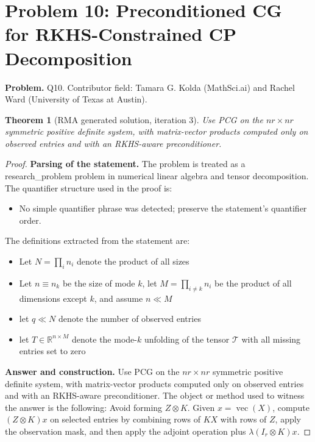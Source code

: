 \documentclass[11pt]{article}
\newtheorem{theorem}{Theorem}
\begin{document}
\section*{Problem 10: Preconditioned CG for RKHS-Constrained CP Decomposition}

\noindent\textbf{Problem.} Q10. Contributor field: Tamara G. Kolda (MathSci.ai) and Rachel Ward (University of Texas at Austin).

\begin{theorem}[RMA generated solution, iteration 3]
Use PCG on the \(nr\times nr\) symmetric positive definite system, with matrix-vector products computed only on observed entries and with an RKHS-aware preconditioner.
\end{theorem}

\begin{proof}
\textbf{Parsing of the statement.}
The problem is treated as a research_problem problem in numerical linear algebra and tensor decomposition.
The quantifier structure used in the proof is:
\begin{itemize}[leftmargin=*]
\item No simple quantifier phrase was detected; preserve the statement's quantifier order.
\end{itemize}
The definitions extracted from the statement are:
\begin{itemize}[leftmargin=*]
\item Let $N = \prod_i n_i$ denote the product of all sizes
\item Let $n \equiv n_k$ be the size of mode $k$, let $M = \prod_{i\neq k} n_i$ be the product of all dimensions except $k$, and assume $n \ll M$
\item let $q \ll N$ denote the number of observed entries
\item let $T \in \mathbb{R}^{n \times M}$ denote the mode-$k$ unfolding of the tensor $\mathcal{T}$ with all missing entries set to zero
\end{itemize}

\textbf{Answer and construction.}
Use PCG on the \(nr\times nr\) symmetric positive definite system, with matrix-vector products computed only on observed entries and with an RKHS-aware preconditioner. The object or method used to witness the answer is the
following: Avoid forming \(Z\otimes K\). Given \(x=\operatorname{vec}(X)\), compute \((Z\otimes K)x\) on selected entries by combining rows of \(KX\) with rows of \(Z\), apply the observation mask, and then apply the adjoint operation plus \(\lambda(I_r\otimes K)x\).


\end{proof}
\end{document}
